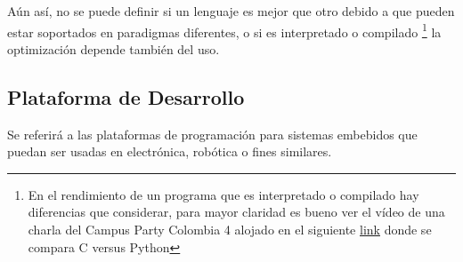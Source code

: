 \documentclass{article}
\begin{document}
Aún así, no se puede definir si un lenguaje es mejor que otro debido a que
pueden estar soportados en paradigmas diferentes, o si es interpretado o
compilado \footnote{En el rendimiento de un programa que es interpretado
		o compilado hay diferencias que considerar, para mayor claridad 
		es bueno ver el vídeo de una charla del Campus Party Colombia 4 
		alojado en el siguiente \href{https://www.youtube.com/watch?v=cPVlYWxcu18}{link} donde se compara C versus Python}
la optimización depende también del uso.

\subsection{Plataforma de Desarrollo}

Se referirá a las plataformas de programación para sistemas embebidos
que puedan ser usadas en electrónica, robótica o fines similares.
\end{document}
